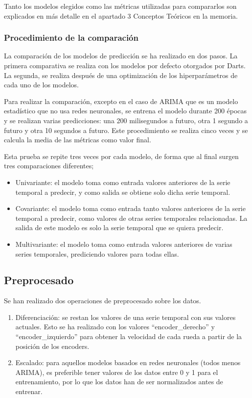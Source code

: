 Tanto los modelos elegidos como las métricas utilizadas para compararlos son explicados en más detalle en el apartado 3 Conceptos
Teóricos en la memoria.

\subsubsection{Procedimiento de la comparación}

La comparación de los modelos de predicción se ha realizado en dos pasos. La primera comparativa se 
realiza con los modelos por defecto otorgados por Darts. La segunda, se realiza después de una 
optimización de los hiperparámetros de cada uno de los modelos.

Para realizar la comparación, excepto en el caso de ARIMA que es un modelo estadístico que no usa redes neuronales, 
se entrena el modelo durante 200 épocas y se realizan varias predicciones: una 200 milisegundos a futuro, otra 
1 segundo a futuro y otra 10 segundos a futuro. Este procedimiento se realiza cinco veces y se calcula la media 
de las métricas como valor final.

Esta prueba se repite tres veces por cada modelo, de forma que al final surgen tres comparaciones 
diferentes;
\begin{itemize}
    \item Univariante: el modelo toma como entrada valores anteriores de la serie temporal a predecir,
        y como salida se obtiene solo dicha serie temporal.
    \item Covariante: el modelo toma como entrada tanto valores anteriores de la serie temporal a predecir, 
        como valores de otras series temporales relacionadas. La salida de este modelo es solo la serie temporal 
        que se quiera predecir.
    \item Multivariante: el modelo toma como entrada valores anteriores de varias series temporales, prediciendo valores
        para todas ellas.
\end{itemize}

\subsection{Preprocesado}

Se han realizado dos operaciones de preprocesado sobre los datos.
\begin{enumerate}
    \item Diferenciación: se restan los valores de una serie temporal con sus valores actuales.
        Esto se ha realizado con los valores ``encoder\_derecho'' y ``encoder\_izquierdo'' para obtener
        la velocidad de cada rueda a partir de la posición de los encoders.
    \item Escalado: para aquellos modelos basados en redes neuronales (todos menos ARIMA), es preferible
        tener valores de los datos entre 0 y 1 para el entrenamiento, por lo que los datos han de 
        ser normalizados antes de entrenar.
\end{enumerate}

